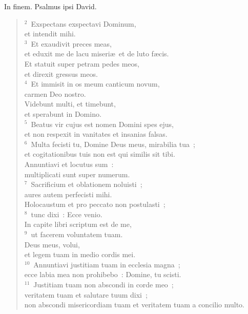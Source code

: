 \lettrine[lines=3,image=true,loversize=0.05,lraise=-0.03]{I}{}n finem. Psalmus ipsi David.
\begin{flushleft}\begin{verse}\vspace{6pt}${}^{2}$~Exspectans exspectavi Dominum,\\ et intendit mihi.\\
${}^{3}$~Et exaudivit preces meas,\\ et eduxit me de lacu miseri\ae\ et de luto f\ae cis.\\ Et statuit super petram pedes meos,\\ et direxit gressus meos.\\
${}^{4}$~Et immisit in os meum canticum novum,\\ carmen Deo nostro.\\ Videbunt multi, et timebunt,\\ et sperabunt in Domino.\\
${}^{5}$~Beatus vir cujus est nomen Domini spes ejus,\\ et non respexit in vanitates et insanias falsas.\\
${}^{6}$~Multa fecisti tu, Domine Deus meus, mirabilia tua~;\\ et cogitationibus tuis non est qui similis sit tibi.\\ Annuntiavi et locutus sum~:\\ multiplicati sunt super numerum.\\
${}^{7}$~Sacrificium et oblationem noluisti~;\\ aures autem perfecisti mihi.\\ Holocaustum et pro peccato non postulasti~;\\
${}^{8}$~tunc dixi~: Ecce venio.\\ In capite libri scriptum est de me,\\
${}^{9}$~ut facerem voluntatem tuam.\\ Deus meus, volui,\\ et legem tuam in medio cordis mei.\\
${}^{10}$~Annuntiavi justitiam tuam in ecclesia magna~;\\ ecce labia mea non prohibebo~: Domine, tu scisti.\\
${}^{11}$~Justitiam tuam non abscondi in corde meo~;\\ veritatem tuam et salutare tuum dixi~;\\ non abscondi misericordiam tuam et veritatem tuam a concilio multo.\\

\end{verse}
\end{flushleft}
